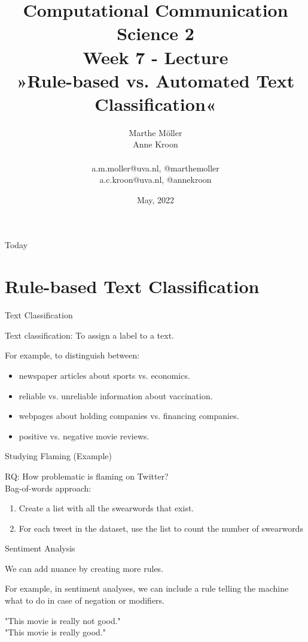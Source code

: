 \documentclass[handout]{beamer}
\title[Computational Communication Science 2]{\textbf{Computational Communication Science 2} \\Week 7 - Lecture\\ »Rule-based vs. Automated Text Classification«}
\author[Marthe Möller, Anne Kroon]{Marthe Möller \\ Anne Kroon \\ ~ \\ \footnotesize{a.m.moller@uva.nl, @marthemoller \\a.c.kroon@uva.nl, @annekroon} \\}
\date{May, 2022}
\institute[Digital Society Minor, University of Amsterdam]{Digital Society Minor, University of Amsterdam}
\begin{document}
	
	\begin{frame}{}
		\titlepage
	\end{frame}
	
	\begin{frame}{Today}
		\tableofcontents
	\end{frame}
	
	
	\section{Rule-based Text Classification}
	
	\begin{frame}{Text Classification} 
		
	Text classification: To assign a label to a text.
	
	For example, to distinguish between:
	\begin{itemize}
		\item newspaper articles about sports vs. economics.
		\item reliable vs. unreliable information about vaccination.
		\item webpages about holding companies vs. financing companies.
		\item positive vs. negative movie reviews.
	\end{itemize}
	
	\end{frame}
		
	\begin{frame}{Studying Flaming (Example)} 
	
	RQ: How problematic is flaming on Twitter? \\
	Bag-of-words approach:
	
	\begin{enumerate}
		\item Create a list with all the swearwords that exist.
		\item For each tweet in the dataset, use the list to count the number of swearwords	
	\end{enumerate}
	

\end{frame}


	\begin{frame}{Sentiment Analysis} 
	
	We can add nuance by creating more rules.
	
	For example, in sentiment analyses, we can include a rule telling the machine what to do in case of negation or modifiers.
	
	"This movie is really not good." \\
	"This movie is really good."
		
	\end{frame}
\end{document}
